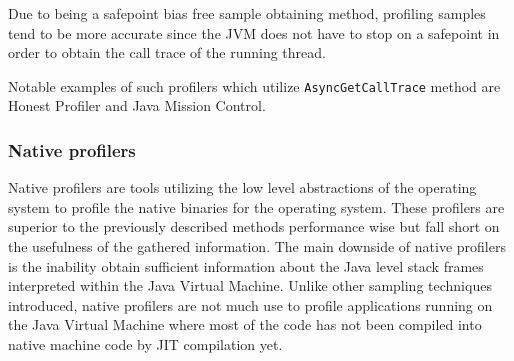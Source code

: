 \documentclass[..thesis.tex]{subfiles}
\begin{document}
Due to being a safepoint bias free sample obtaining method, profiling samples tend to be more accurate since the JVM does not have to stop on a safepoint in order to obtain the call trace of the running thread. 

Notable examples of such profilers which utilize \texttt{Async\-Get\-Call\-Trace} method  are Honest Profiler and Java Mission Control. 

\subsubsection{Native profilers}
Native profilers are tools utilizing the low level abstractions of the operating system to  profile the native binaries for the operating system. These profilers are superior to the previously described methods performance wise but fall short on the usefulness of the gathered information. The main downside of native profilers is the inability obtain sufficient information about the Java level stack frames interpreted within the Java Virtual Machine. Unlike other sampling techniques introduced, native profilers are not much use to profile applications running on the Java Virtual Machine where most of the code has not been compiled into native machine code by JIT compilation yet.


\end{document}
